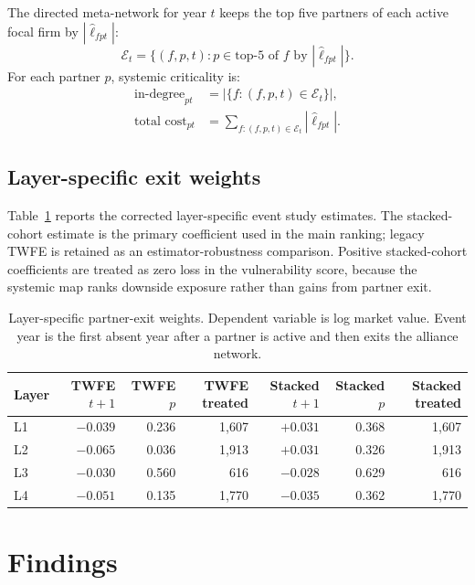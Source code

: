 \documentclass[11pt,letterpaper]{article}
\begin{document}
The directed meta-network for year $t$ keeps the top five partners of
each active focal firm by $|\widehat{\ell}_{fpt}|$:
\begin{equation}
\mathcal{E}_t = \{(f,p,t): p \in \textrm{top-5 of } f
                  \textrm{ by } |\widehat{\ell}_{fpt}|\}.
\end{equation}
For each partner $p$, systemic criticality is:
\begin{align}
\textrm{in-degree}_{pt} &= |\{f : (f,p,t)\in\mathcal{E}_t\}|,\\
\textrm{total cost}_{pt} &= \sum_{f:(f,p,t)\in\mathcal{E}_t}
|\widehat{\ell}_{fpt}|.
\end{align}

\subsection{Layer-specific exit weights}

Table~\ref{tab:weights} reports the corrected layer-specific event
study estimates.  The stacked-cohort estimate is the primary
coefficient used in the main ranking; legacy TWFE is retained as an
estimator-robustness comparison.  Positive stacked-cohort coefficients
are treated as zero loss in the vulnerability score, because the
systemic map ranks downside exposure rather than gains from partner
exit.

\begin{table}[H]
\centering
\footnotesize
\caption{Layer-specific partner-exit weights.  Dependent variable is
log market value.  Event year is the first absent year after a partner
is active and then exits the alliance network.}
\label{tab:weights}
\begin{tabular}{lrrrrrr}
\toprule
Layer & TWFE $t{+}1$ & TWFE $p$ & TWFE treated
      & Stacked $t{+}1$ & Stacked $p$ & Stacked treated \\
\midrule
L1 & $-0.039$ & 0.236 & 1{,}607 & $+0.031$ & 0.368 & 1{,}607 \\
L2 & $-0.065$ & 0.036 & 1{,}913 & $+0.031$ & 0.326 & 1{,}913 \\
L3 & $-0.030$ & 0.560 &   616 & $-0.028$ & 0.629 &   616 \\
L4 & $-0.051$ & 0.135 & 1{,}770 & $-0.035$ & 0.362 & 1{,}770 \\
\bottomrule
\end{tabular}
\end{table}

\section{Findings}
\label{sec:findings}
\end{document}
